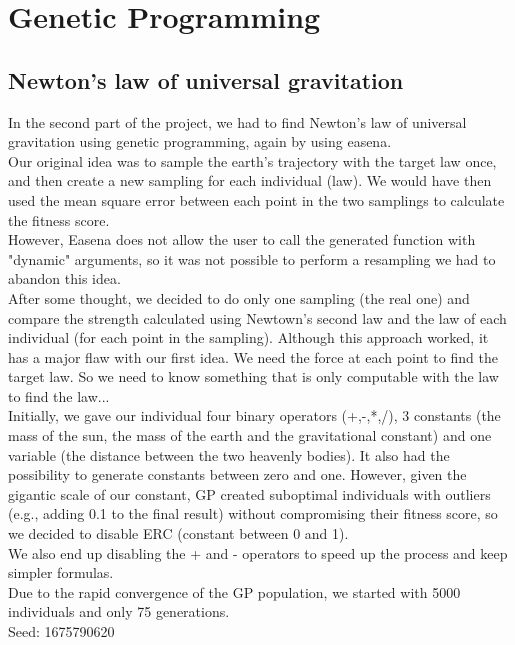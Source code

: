 \section{Genetic Programming}

\subsection{Newton's law of universal gravitation}

In the second part of the project, we had to find Newton's law of universal gravitation using genetic programming, again by using easena.\\

Our original idea was to sample the earth's trajectory with the target law once, and then create a new sampling for each individual (law). We would have then used the mean square error between each point in the two samplings to calculate the fitness score.\\
However, Easena does not allow the user to call the generated function with "dynamic" arguments, so it was not possible to perform a resampling we had to abandon this idea.\\
After some thought, we decided to do only one sampling (the real one) and compare the strength calculated using Newtown's second law and the law of each individual (for each point in the sampling). Although this approach worked, it has a major flaw with our first idea. We need the force at each point to find the target law. So we need to know something that is only computable with the law to find the law...\\

Initially, we gave our individual four binary operators (+,-,*,/), 3 constants (the mass of the sun, the mass of the earth and the gravitational constant) and one variable (the distance between the two heavenly bodies). It also had the possibility to generate constants between zero and one. However, given the gigantic scale of our constant, GP created suboptimal individuals with outliers (e.g., adding 0.1 to the final result) without compromising their fitness score, so we decided to disable ERC (constant between 0 and 1).\\
We also end up disabling the + and - operators to speed up the process and keep simpler formulas.\\

Due to the rapid convergence of the GP population, we started with 5000 individuals and only 75 generations.\\

Seed: 1675790620\\